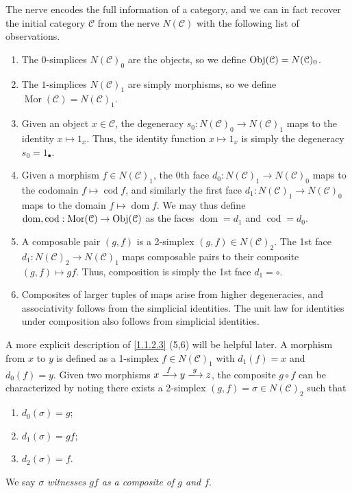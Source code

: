 \begin{remark}\label{1.1.2.3}
The nerve encodes the full information of a category, and we can in fact recover the initial category $\mathcal{C} $ from the nerve $N(\mathcal{C} )$ with the following list of observations.
\begin{enumerate}
	\item The $0$-simplices $N(\mathcal{C} )_0$ are the objects, so we define $\operatorname{Obj}(\mathcal{C} ) =N(\mathcal{C} )_0$.
	\item The $1$-simplices $N(\mathcal{C} )_1$ are simply morphisms, so we define $\operatorname{Mor} (\mathcal{C} )=N(\mathcal{C} )_1$.
	\item Given an object $x\in \mathcal{C} $, the degeneracy $s_0: N(\mathcal{C} )_0 \to N(\mathcal{C} )_1$ maps to the identity $x\mapsto 1_x$. Thus, the identity function $x\mapsto 1_x$ is simply the degeneracy $s_0 = 1_{\bullet} $.
	\item Given a morphism $f\in N(\mathcal{C} )_1$, the $0$th face $d_0: N(\mathcal{C} )_1 \to N(\mathcal{C} )_0$ maps to the codomain $f\mapsto \operatorname{cod} f$, and similarly the first face $d_1: N(\mathcal{C})_1 \to N(\mathcal{C} )_0$ maps to the domain $f\mapsto \operatorname{dom} f$. We may thus define $\operatorname{dom} , \operatorname{cod} : \operatorname{Mor} (\mathcal{C})  \to \operatorname{Obj}(\mathcal{C} ) $ as the faces $\operatorname{dom} =d_1$ and $\operatorname{cod} =d_0$.
	\item A composable pair $(g,f)$ is a 2-simplex $(g,f)\in N(\mathcal{C} )_2$. The 1st face $d_1: N(\mathcal{C} )_2 \to N(\mathcal{C} )_1$ maps composable pairs to their composite $(g,f)\mapsto gf$. Thus, composition is simply the 1st face $d_1=\circ $.
	\item Composites of larger tuples of maps arise from higher degeneracies, and associativity follows from the simplicial identities. The unit law for identities under composition also follows from simplicial identities.
\end{enumerate}
\end{remark}

A more explicit description of \cref{1.1.2.3} (5,6) will be helpful later. A morphism from $x$ to $y$ is defined as a 1-simplex $f\in N(\mathcal{C} )_1$ with $d_1(f)=x$ and $d_0(f)=y$. Given two morphisms $x\xlongrightarrow{f}y\xlongrightarrow{g}z$, the composite $g\circ f$ can be characterized by noting there exists a 2-simplex $(g,f)=\sigma\in N(\mathcal{C} )_2$ such that
\begin{enumerate}
	\item $d_0(\sigma)=g$;
	\item $d_1(\sigma)=gf$;
	\item $d_2(\sigma)=f$.
\end{enumerate}
We say $\sigma$ \emph{witnesses $gf$ as a composite of $g$ and $f$}.

